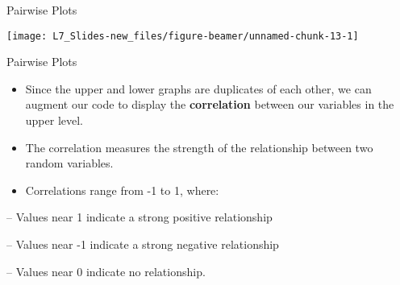 \documentclass[ignorenonframetext,]{beamer}
\begin{document}
\begin{frame}{Pairwise Plots}

\small

\begin{center}\texttt{[image: L7\_Slides-new\_files/figure-beamer/unnamed-chunk-13-1]} \end{center}

\end{frame}

\begin{frame}{Pairwise Plots}

\begin{itemize}
\item
  Since the upper and lower graphs are duplicates of each other, we can
  augment our code to display the \textbf{correlation} between our
  variables in the upper level.
\item
  The correlation measures the strength of the relationship between two
  random variables.
\item
  Correlations range from -1 to 1, where:
\end{itemize}

-- Values near 1 indicate a strong positive relationship

-- Values near -1 indicate a strong negative relationship

-- Values near 0 indicate no relationship.

\end{frame}
\end{document}
